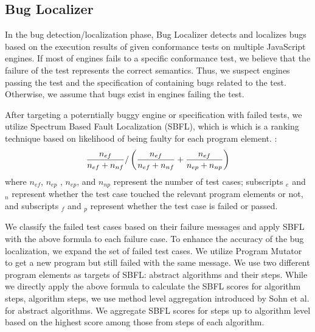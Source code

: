 \subsection{Bug Localizer}

In the bug detection/localization phase, \textsf{Bug Localizer} detects and
localizes bugs based on the execution results of given conformance tests on
multiple JavaScript engines.  If most of engines fails to a specific
conformance test, we believe that the failure of the test represents the
correct semantics.  Thus, we suspect engines passing the test and the
specification of containing bugs related to the test.  Otherwise, we assume
that bugs exist in engines failing the test.

After targeting a poterntially buggy engine or specification with failed tests,
we utilize Spectrum Based Fault Localization (SBFL)\cite{sbfl-survey}, which is
which is a ranking technique based on likelihood of being faulty for each
program element.  :
\[
  {{n_{ef}}\over{n_{ef} + n_{nf}}} /
  \left(
    {{n_{ef}}\over{n_{ef} + n_{nf}}} +
    {{n_{ef}}\over{n_{ep} + n_{np}}}
  \right)
\]
where $n_{ef}$, $n_{ep}$ , $n_{ep}$, and $n_{np}$ represent the number of test
cases; subscripts ${}_e$ and ${}_n$ represent whether the test case touched the
relevant program elements or not, and subscripts ${}_f$ and ${}_p$ represent
whether the test case is failed or passed.

We classify the failed test cases based on their failure messages and apply SBFL
with the above formula to each failure case.  To enhance the accuracy of the bug
localization, we expand the set of failed test cases.  We utilize
\textsf{Program Mutator} to get a new program but still failed with the same
message.  We use two different program elements as targets of SBFL: abstract
algorithms and their steps.  While we directly apply the above formula to
calculate the SBFL scores for algorithm steps, algorithm steps, we use
method level aggregation introduced by Sohn et al.\cite{fluccs} for abstract
algorithms.  We aggregate SBFL scores for steps up to algorithm level based on
the highest score among those from steps of each algorithm.
